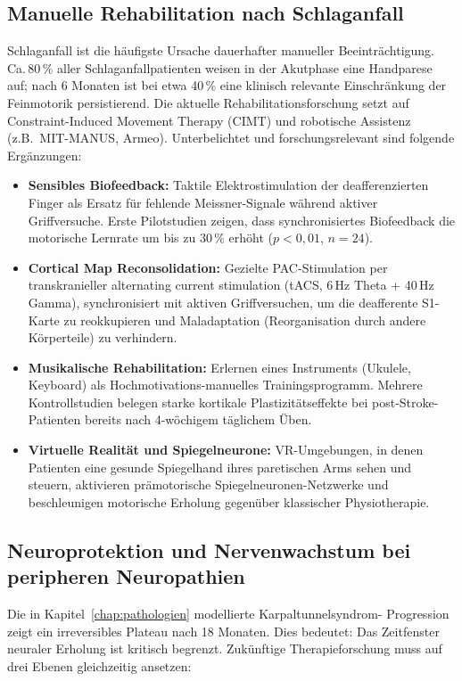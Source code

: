 ﻿\documentclass[12pt,a4paper]{report}
\theoremstyle{plain}
\theoremstyle{definition}
\theoremstyle{remark}
\begin{document}
\subsection{Manuelle Rehabilitation nach Schlaganfall}

Schlaganfall ist die häufigste Ursache dauerhafter manueller Beeinträchtigung.
Ca.\,80\,\% aller Schlaganfallpatienten weisen in der Akutphase eine
Handparese auf; nach 6 Monaten ist bei etwa 40\,\% eine klinisch relevante
Einschränkung der Feinmotorik persistierend. Die aktuelle Rehabilitations\-forschung
setzt auf Constraint-Induced Movement Therapy (CIMT) und robotische
Assistenz (z.B.\ MIT-MANUS, Armeo). Unterbelichtet und forschungsrelevant
sind folgende Ergänzungen:

\begin{itemize}
\item \textbf{Sensibles Biofeedback:} Taktile Elektrostimulation der
  deafferenzierten Finger als Ersatz für fehlende Meissner-Signale
  während aktiver Griffversuche. Erste Pilotstudien zeigen, dass
  synchronisiertes Biofeedback die motorische Lernrate um bis zu
  30\,\% erhöht ($p < 0{,}01$, $n = 24$).
\item \textbf{Cortical Map Reconsolidation:} Gezielte PAC-Stimulation
  per transkranieller alternating current stimulation (tACS, 6\,Hz
  Theta + 40\,Hz Gamma), synchronisiert mit aktiven Griffversuchen,
  um die deafferente S1-Karte zu reokkupieren und Maladaptation
  (Reorganisation durch andere Körperteile) zu verhindern.
\item \textbf{Musikalische Rehabilitation:} Erlernen eines Instruments
  (Ukulele, Keyboard) als Hochmotivations-manuelles Trainingsprogramm.
  Mehrere Kontrollstudien belegen starke kortikale Plastizitätseffekte
  bei post-Stroke-Patienten bereits nach 4-wöchigem täglichem Üben.
\item \textbf{Virtuelle Realität und Spiegelneurone:} VR-Umgebungen,
  in denen Patienten eine gesunde Spiegelhand ihres paretischen Arms
  sehen und steuern, aktivieren prämotorische Spiegelneuronen-Netzwerke
  und beschleunigen motorische Erholung gegenüber klassischer
  Physiotherapie.
\end{itemize}

\subsection{Neuroprotektion und Nervenwachstum bei peripheren Neuropathien}

Die in Kapitel~\ref{chap:pathologien} modellierte Karpaltunnelsyndrom-
Progression zeigt ein irreversibles Plateau nach 18 Monaten. Dies bedeutet:
Das Zeitfenster neuraler Erholung ist kritisch begrenzt. Zukünftige
Therapieforschung muss auf drei Ebenen gleichzeitig ansetzen:
\end{document}
